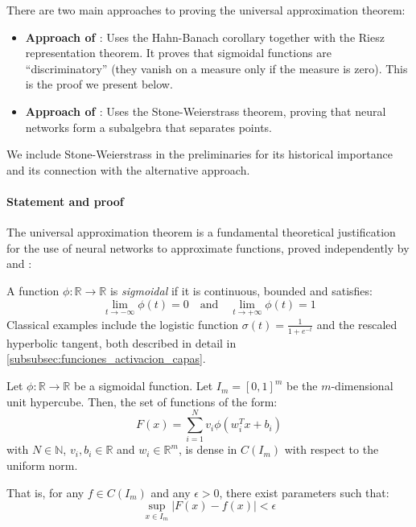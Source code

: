 There are two main approaches to proving the universal approximation theorem:
\begin{itemize}
	\item \textbf{Approach of \citet{cybenko1989}}: Uses the Hahn-Banach corollary together with the Riesz representation theorem. It proves that sigmoidal functions are ``discriminatory'' (they vanish on a measure only if the measure is zero). This is the proof we present below.
	\item \textbf{Approach of \citet{hornik1989}}: Uses the Stone-Weierstrass theorem, proving that neural networks form a subalgebra that separates points.
\end{itemize}
We include Stone-Weierstrass in the preliminaries for its historical importance and its connection with the alternative approach.

\paragraph{Statement and proof}

The universal approximation theorem is a fundamental theoretical justification for the use of neural networks to approximate functions, proved independently by \citet{cybenko1989} and \citet{hornik1989}:

\begin{definition}\label{def:funcion_sigmoidal}
	A function \(\phi: \mathbb{R} \to \mathbb{R}\) is \textit{sigmoidal} if it is continuous, bounded and satisfies:
	\[
		\lim_{t \to -\infty} \phi(t) = 0 \quad \text{and} \quad \lim_{t \to +\infty} \phi(t) = 1
	\]
	Classical examples include the logistic function \(\sigma(t) = \frac{1}{1+e^{-t}}\) and the rescaled hyperbolic tangent, both described in detail in \autoref{subsubsec:funciones_activacion_capas}.
\end{definition}

\begin{theorem}\label{thm:aproximacion_universal}
	Let \(\phi: \mathbb{R} \to \mathbb{R}\) be a sigmoidal function. Let \(I_m = [0,1]^m\) be the \(m\)-dimensional unit hypercube. Then, the set of functions of the form:
	\[
		F(x) = \sum_{i=1}^{N} v_i \phi(w_i^T x + b_i)
	\]
	with \(N \in \mathbb{N}\), \(v_i, b_i \in \mathbb{R}\) and \(w_i \in \mathbb{R}^m\), is dense in \(C(I_m)\) with respect to the uniform norm.

	That is, for any \(f \in C(I_m)\) and any \(\epsilon > 0\), there exist parameters such that:
	\[
		\sup_{x \in I_m} |F(x) - f(x)| < \epsilon
	\]
\end{theorem}

